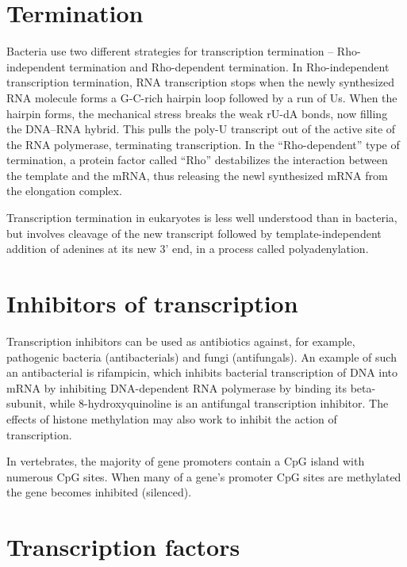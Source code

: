 \hypertarget{termination-2}{%
\section{Termination}\label{termination-2}}

Bacteria use two different strategies for transcription termination -- Rho-independent termination and Rho-dependent termination. In Rho-independent transcription termination, RNA transcription stops when the newly synthesized RNA molecule forms a G-C-rich hairpin loop followed by a run of Us. When the hairpin forms, the mechanical stress breaks the weak rU-dA bonds, now filling the DNA--RNA hybrid. This pulls the poly-U transcript out of the active site of the RNA polymerase, terminating transcription. In the ``Rho-dependent'' type of termination, a protein factor called ``Rho'' destabilizes the interaction between the template and the mRNA, thus releasing the newl synthesized mRNA from the elongation complex.

Transcription termination in eukaryotes is less well understood than in bacteria, but involves cleavage of the new transcript followed by template-independent addition of adenines at its new 3' end, in a process called polyadenylation.

\hypertarget{inhibitors-of-transcription}{%
\section{Inhibitors of transcription}\label{inhibitors-of-transcription}}

Transcription inhibitors can be used as antibiotics against, for example, pathogenic bacteria (antibacterials) and fungi (antifungals). An example of such an antibacterial is rifampicin, which inhibits bacterial transcription of DNA into mRNA by inhibiting DNA-dependent RNA polymerase by binding its beta-subunit, while 8-hydroxyquinoline is an antifungal transcription inhibitor. The effects of histone methylation may also work to inhibit the action of transcription.

In vertebrates, the majority of gene promoters contain a CpG island with numerous CpG sites. When many of a gene's promoter CpG sites are methylated the gene becomes inhibited (silenced).

\hypertarget{transcription-factors}{%
\section{Transcription factors}\label{transcription-factors}}

